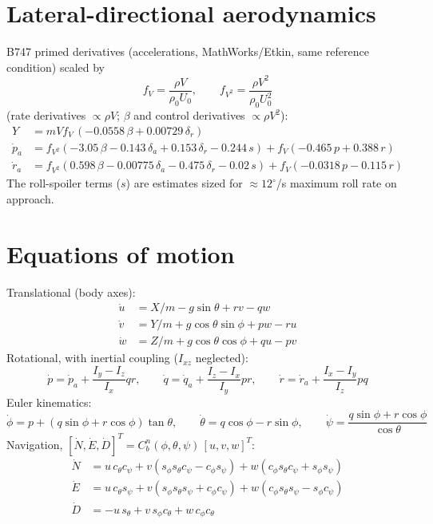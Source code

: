 \documentclass[10pt]{article}
\begin{document}
\section{Lateral-directional aerodynamics}
B747 primed derivatives (accelerations, MathWorks/Etkin, same reference condition) scaled by
\[
f_V=\frac{\rho V}{\rho_0U_0},\qquad f_{V^2}=\frac{\rho V^2}{\rho_0U_0^2}
\]
(rate derivatives $\propto\rho V$; $\beta$ and control derivatives $\propto\rho V^2$):
\begin{align*}
Y &= mV f_V\,(-0.0558\,\beta + 0.00729\,\delta_r)\\
\dot p_a &= f_{V^2}(-3.05\,\beta - 0.143\,\delta_a + 0.153\,\delta_r - 0.244\,s) + f_V(-0.465\,p + 0.388\,r)\\
\dot r_a &= f_{V^2}(0.598\,\beta - 0.00775\,\delta_a - 0.475\,\delta_r - 0.02\,s) + f_V(-0.0318\,p - 0.115\,r)
\end{align*}
The roll-spoiler terms ($s$) are estimates sized for $\approx12^\circ$/s maximum roll rate on approach.

\section{Equations of motion}
Translational (body axes):
\begin{align*}
\dot u &= X/m - g\sin\theta + rv - qw\\
\dot v &= Y/m + g\cos\theta\sin\phi + pw - ru\\
\dot w &= Z/m + g\cos\theta\cos\phi + qu - pv
\end{align*}
Rotational, with inertial coupling ($I_{xz}$ neglected):
\[
\dot p=\dot p_a+\frac{I_y-I_z}{I_x}qr,\qquad
\dot q=\dot q_a+\frac{I_z-I_x}{I_y}pr,\qquad
\dot r=\dot r_a+\frac{I_x-I_y}{I_z}pq
\]
Euler kinematics:
\[
\dot\phi=p+(q\sin\phi+r\cos\phi)\tan\theta,\qquad
\dot\theta=q\cos\phi-r\sin\phi,\qquad
\dot\psi=\frac{q\sin\phi+r\cos\phi}{\cos\theta}
\]
Navigation, $[\dot N,\dot E,\dot D]^T = C_b^n(\phi,\theta,\psi)\,[u,v,w]^T$:
\begin{align*}
\dot N &= u\,c_\theta c_\psi + v(s_\phi s_\theta c_\psi - c_\phi s_\psi) + w(c_\phi s_\theta c_\psi + s_\phi s_\psi)\\
\dot E &= u\,c_\theta s_\psi + v(s_\phi s_\theta s_\psi + c_\phi c_\psi) + w(c_\phi s_\theta s_\psi - s_\phi c_\psi)\\
\dot D &= -u\,s_\theta + v\,s_\phi c_\theta + w\,c_\phi c_\theta
\end{align*}
\end{document}

